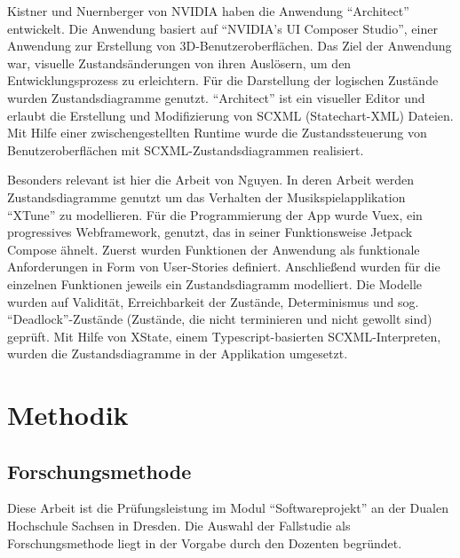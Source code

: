 \documentclass[first=Christoph,last=Hoentzsch,company=Softwareprojekt,location=Dresden,simple, noheader]{baarticle}
\begin{document}
\begin{basimple}
        Kistner und Nuernberger von NVIDIA haben die Anwendung \enquote{Architect} entwickelt.
        Die Anwendung basiert auf \enquote{NVIDIA's UI Composer Studio}, einer Anwendung zur Erstellung von 3D-Benutzeroberflächen.
        Das Ziel der Anwendung war, visuelle Zustandsänderungen von ihren Auslösern, um den Entwicklungsprozess zu erleichtern.
        Für die Darstellung der logischen Zustände wurden Zustandsdiagramme genutzt.
        \enquote{Architect} ist ein visueller Editor und erlaubt die Erstellung und Modifizierung von \gls{SCXML} (Statechart-XML) Dateien.
        Mit Hilfe einer zwischengestellten Runtime wurde die Zustandssteuerung von Benutzeroberflächen mit \gls{SCXML}-Zustandsdiagrammen realisiert.

        Besonders relevant ist hier die Arbeit von Nguyen.
        In deren Arbeit werden Zustandsdiagramme genutzt um das Verhalten der Musikspielapplikation \enquote{XTune} zu modellieren.
        Für die Programmierung der App wurde Vuex, ein progressives Webframework, genutzt, das in seiner Funktionsweise Jetpack Compose ähnelt.
        Zuerst wurden Funktionen der Anwendung als funktionale Anforderungen in Form von User-Stories definiert.
        Anschließend wurden für die einzelnen Funktionen jeweils ein Zustandsdiagramm modelliert.
        Die Modelle wurden auf Validität, Erreichbarkeit der Zustände, Determinismus und sog. \enquote{Deadlock}-Zustände (Zustände, die nicht terminieren und nicht gewollt sind) geprüft.
        Mit Hilfe von XState, einem Typescript-basierten \gls{SCXML}-Interpreten, wurden die Zustandsdiagramme in der Applikation umgesetzt.

        \newpage
    \section{Methodik} \label{sec:meth}   
        \subsection{Forschungsmethode}
        Diese Arbeit ist die Prüfungsleistung im Modul \enquote{Softwareprojekt} an der Dualen Hochschule Sachsen in Dresden.
        Die Auswahl der Fallstudie als Forschungsmethode liegt in der Vorgabe durch den Dozenten begründet.


\end{basimple}
\end{document}
